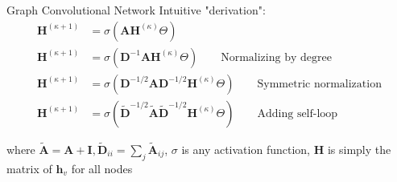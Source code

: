 \documentclass{beamer}
\newcommand{\node}{v}
\newcommand{\nrepresent}{h}
\newcommand{\NodeRepMat}{\mathbf{H}}
\newcommand{\DegMat}{\mathbf{D}}
\newcommand{\iter}{\kappa}
\newcommand{\AdjMat}{\mathbf{A}}
\newcommand{\Identity}{\mathbf{I}}
\begin{document}
\begin{frame}{Graph Convolutional Network}
    Intuitive "derivation": 
    \begin{align*}
        \NodeRepMat^{(\iter+1)}
        &=
        \sigma
        \left( 
            \AdjMat \NodeRepMat^{(\iter)} \Theta
        \right) 
    \\
        \NodeRepMat^{(\iter+1)}
        &=
        \sigma
        \left( 
            \DegMat^{-1}\AdjMat \NodeRepMat^{(\iter)} \Theta
        \right) 
        \qquad{\text{Normalizing by degree}}
    \\
        \NodeRepMat^{(\iter+1)}
        &=
        \sigma
        \left( 
            \DegMat^{-1/2}\AdjMat\DegMat^{-1/2} \NodeRepMat^{(\iter)} \Theta
        \right) 
        \qquad{\text{Symmetric normalization}} %
    \\
        \NodeRepMat^{(\iter+1)}
        &=
        \sigma
        \left( 
            \widetilde{\DegMat}^{-1/2}
            \widetilde{\AdjMat}
            \widetilde{\DegMat}^{-1/2} \NodeRepMat^{(\iter)} \Theta
        \right) 
        \qquad{\text{Adding self-loop}}
    \end{align*}
    
    where $\widetilde{\AdjMat} = \AdjMat + \Identity, \widetilde{\DegMat}_{ii} = \sum_j \widetilde{\AdjMat}_{ij}$, $\sigma$ is any activation function, $\NodeRepMat$ is simply the matrix of $\mathbf{\nrepresent}_\node$ for all nodes 
\end{frame}
\end{document}
